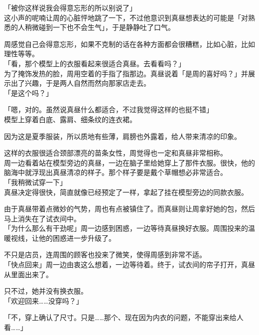 「被你这样说我会得意忘形的所以别说了」\\

这小声的呢喃让周的心脏怦地跳了一下，不过他意识到真昼想表达的可能是「对熟悉的人稍微碰到一下也不会生气」，于是静静吐了口气。

周感觉自己会得意忘形，如果不克制的话在各种方面都会很糟糕，比如心脏，比如理性等等。\\

「看，那个模型上的衣服看起来很适合真昼。去看看吗？」\\

为了掩饰发热的脸，周用空着的手指了指那边。真昼说着「是周的喜好吗？」并展示出了兴趣，于是两人自然而然向那家店走去。\\

「是这个吗？」

「嗯，对的。虽然说真昼什么都适合，不过我觉得这样的也挺不错」\\

模型上穿着白底、露肩、细条纹的连衣裙。

因为这是夏季服装，所以质地有些薄，肩膀也外露着，给人带来清凉的印象。

这样的衣服很适合颈部漂亮的苗条女性，周觉得也一定和真昼非常相称。\\

周一边看着站在模型旁边的真昼，一边在脑子里给她穿上了那件衣服。很快，他的脑海中就浮现出真昼清凉的样子。那个样子要是戴个草帽想必非常适合。\\

「我稍微试穿一下」\\

真昼决定得很快，简直就像已经预定了一样，拿起了挂在模型旁边的同款衣服。

由于真昼带着点微妙的气势，周也有点被镇住了。而真昼则让周拿好她的包，然后马上消失在了试衣间中。\\

「为什么那么有干劲呢」周一边感到困惑，一边等待真昼换好衣服。周围投来的温暖视线，让他的困惑进一步升级了。

不只是店员，连周围的顾客也投来了微笑，使得周感到非常不适。\\

「快点回来」周一边由衷这么想着，一边等待着。终于，试衣间的帘子打开，真昼从里面出来了。

只不过，她并没有换衣服。\\

「欢迎回来……没穿吗？」

「不，穿上确认了尺寸。只是……那个、现在因为内衣的问题，不能穿出来给人看……」

